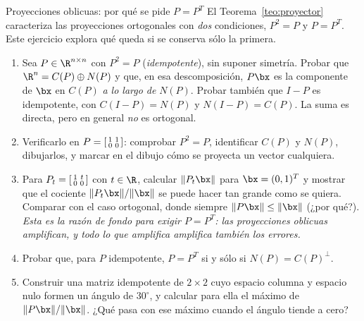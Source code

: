 \begin{entrega}{Proyecciones oblicuas: por qué se pide $P=P^T$}
\label{ent:oblicuas}
El Teorema~\ref{teo:proyector} caracteriza las proyecciones ortogonales con
\emph{dos} condiciones, $P^2=P$ y $P=P^T$. Este ejercicio explora qué queda si
se conserva sólo la primera.

\begin{enumerate}[label=\textbf{(\alph*)},itemsep=3pt,topsep=4pt]
\item Sea $P\in\R^{n\times n}$ con $P^2=P$ (\emph{idempotente}), sin suponer
simetría. Probar que $\R^n=C(P)\oplus N(P)$ y que, en esa descomposición,
$P\bx$ es la componente de $\bx$ en $C(P)$ \emph{a lo largo de} $N(P)$.
Probar también que $I-P$ es idempotente, con $C(I-P)=N(P)$ y $N(I-P)=C(P)$.
La suma es directa, pero en general \emph{no} es ortogonal.

\item Verificarlo en
$P=\begin{bsmallmatrix}1&1\\ 0&0\end{bsmallmatrix}$: comprobar $P^2=P$,
identificar $C(P)$ y $N(P)$, dibujarlos, y marcar en el dibujo cómo se
proyecta un vector cualquiera.

\item Para $P_t=\begin{bsmallmatrix}1&t\\ 0&0\end{bsmallmatrix}$ con
$t\in\R$, calcular $\|P_t\bx\|$ para $\bx=(0,1)^T$ y mostrar que el cociente
$\|P_t\bx\|/\|\bx\|$ se puede hacer tan grande como se quiera. Comparar con
el caso ortogonal, donde siempre $\|P\bx\|\le\|\bx\|$ (¿por qué?). \emph{Esta
es la razón de fondo para exigir $P=P^T$: las proyecciones oblicuas
amplifican, y todo lo que amplifica amplifica también los errores.}

\item Probar que, para $P$ idempotente, $P=P^T$ si y sólo si
$N(P)=C(P)^{\perp}$.

\item Construir una matriz idempotente de $2\times2$ cuyo espacio columna y
espacio nulo formen un ángulo de $30^{\circ}$, y calcular para ella el máximo
de $\|P\bx\|/\|\bx\|$. ¿Qué pasa con ese máximo cuando el ángulo tiende a
cero?
\end{enumerate}

\medskip
{}
\end{entrega}

